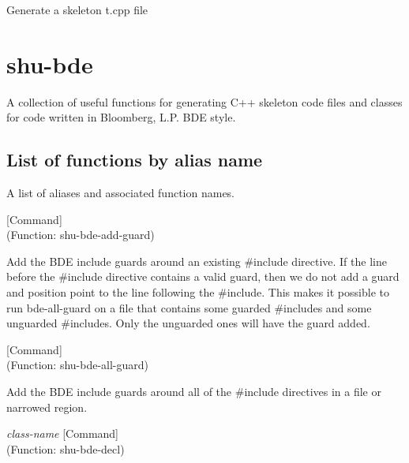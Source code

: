\begin{doc-string}
Generate a skeleton t.cpp file
\end{doc-string}

\eject
\section{shu-bde}


A collection of useful functions for generating C++ skeleton code files
and classes for code written in Bloomberg, L.P. BDE style.


\subsection{List of functions by alias name}

A list of aliases and associated function names.



\vspace{1em}
\noindent
{}
\usebox{\funcname}
 \hfill [Command]\\%
 (Function: shu-bde-add-guard)

\begin{doc-string}
Add the BDE include guards around an existing \#include directive.  If the line
before the \#include directive contains a valid guard, then we do not add a guard
and position point to the line following the \#include.  This makes it possible to
run bde-all-guard on a file that contains some guarded \#includes and some unguarded
\#includes.  Only the unguarded ones will have the guard added.
\end{doc-string}

\vspace{1em}
\noindent
{}
\usebox{\funcname}
 \hfill [Command]\\%
 (Function: shu-bde-all-guard)

\begin{doc-string}
Add the BDE include guards around all of the \#include directives in a file
or narrowed region.
\end{doc-string}

\vspace{1em}
\noindent
{}
\usebox{\funcname}\emph{class-name}
 \hfill [Command]\\%
 (Function: shu-bde-decl)

